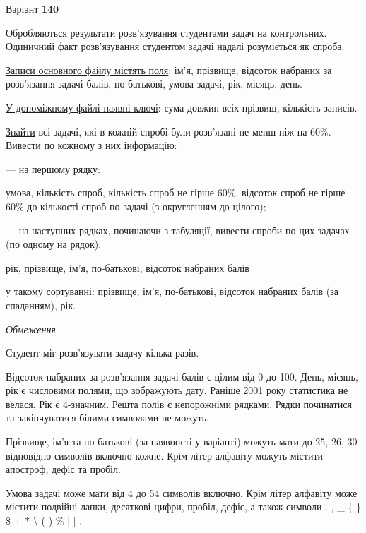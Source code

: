 \documentclass[11pt, ukrainian]{article}
\begin{document}
\par
\newpage

{\center Варіант  \No \textbf { 140 }\par}
\bigskip
Обробляються результати розв’язування студентами задач на контрольних.
Одиничний факт роз\-в’я\-зу\-вання студентом задачі надалі розуміється як спроба.

\underline{Записи основного файлу містять поля}: ім’я, прізвище, відсоток набраних за розв’язання задачі балів, по-батькові, умова задачі, рік, місяць, день.

\underline{У допоміжному файлі наявні ключі}: сума довжин всіх прізвищ, кількість записів.

\underline{Знайти} всі задачі, які в кожній спробі були розв’язані не менш ніж на 60\%. Вивести по кожному з них інформацію:\par
{\noindent}--- на першому рядку:\par
умова, кількість спроб, кількість спроб не гірше 60\%, відсоток спроб не гірше 60\% до кількості спроб по задачі (з округленням до цілого);

{\noindent}--- на наступних рядках, починаючи з табуляції, вивести спроби по цих задачах (по одному на рядок):\par
рік, прізвище, ім’я, по-батькові, відсоток набраних балів

{\noindent}у такому сортуванні: прізвище, ім’я, по-батькові, відсоток набраних балів (за спаданням), рік.


\bigskip\textit{Обмеження}

Студент міг розв’язувати задачу кілька разів.

Відсоток набраних за розв’язання задачі балів є цілим від 0 до 100.
День, місяць, рік є числовими полями, що зображують дату.
Раніше 2001 року статистика не велася. Рік є 4-значним.
Решта полів є непорожніми рядками.
Рядки починатися та закінчуватися білими символами не можуть.

Прізвище, ім’я та по-батькові (за наявності у варіанті) можуть мати до 25, 26, 30 відповідно символів включно кожне. 
Крім літер алфавіту можуть містити апостроф, дефіс та пробіл.

Умова задачі може мати від 4 до 54 символів включно.
Крім літер алфавіту може містити подвійні лапки, десяткові цифри, пробіл, дефіс,
а також символи . , \_ \{ \} \$ $+$ $*$ {\textbackslash} ( ) \% $[$ $]$ .
\end{document}
